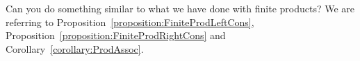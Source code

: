 \begin{exercise}
  Can you do something similar to what we have done with finite
  products? We are referring to
  Proposition~\ref{proposition:FiniteProdLeftCons},
  Proposition~\ref{proposition:FiniteProdRightCons} and
  Corollary~\ref{corollary:ProdAssoc}.
\end{exercise}



